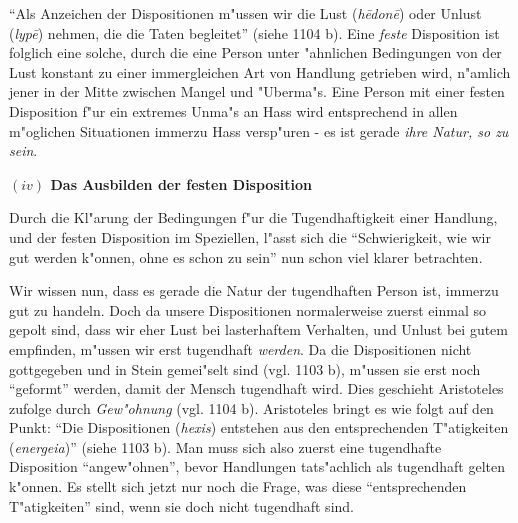\documentclass[a4paper, emulatestandardclasses, 12pt]{scrartcl}
\begin{document}
\begin{onehalfspace}
"`Als Anzeichen der Dispositionen m"ussen wir die Lust (\emph{h\={e}don\={e}}) oder Unlust (\emph{lyp\={e}}) nehmen, die die Taten begleitet"' (siehe 1104 b). Eine \emph{feste} Disposition ist folglich eine solche, durch die eine Person unter "ahnlichen Bedingungen von der Lust konstant zu einer immergleichen Art von Handlung getrieben wird, n"amlich jener in der Mitte zwischen Mangel und "Uberma"s. Eine Person mit einer festen Disposition f"ur ein extremes Unma"s an Hass wird entsprechend in allen m"oglichen Situationen immerzu Hass versp"uren - es ist gerade \emph{ihre Natur, so zu sein}. 

\vspace{6mm}
\newpage
\noindent\textbf{$(iv)$ Das Ausbilden der festen Disposition}	

\noindent Durch die Kl"arung der Bedingungen f"ur die Tugendhaftigkeit einer Handlung, und der festen Disposition im Speziellen, l"asst sich die "`Schwierigkeit, wie wir gut werden k"onnen, ohne es schon zu sein"' nun schon viel klarer betrachten. 

Wir wissen nun, dass es gerade die Natur der tugendhaften Person ist, immerzu gut zu handeln. Doch da unsere Dispositionen normalerweise zuerst einmal so gepolt sind, dass wir eher Lust bei lasterhaftem Verhalten, und Unlust bei gutem empfinden, m"ussen wir erst tugendhaft \emph{werden}. Da die Dispositionen nicht gottgegeben und in Stein gemei"selt sind (vgl. 1103 b), m"ussen sie erst noch "`geformt"' werden, damit der Mensch tugendhaft wird. Dies geschieht Aristoteles zufolge durch \emph{Gew"ohnung} (vgl. 1104 b). Aristoteles bringt es wie folgt auf den Punkt: "`Die Dispositionen (\emph{hexis}) entstehen aus den entsprechenden T"atigkeiten (\emph{energeia})"' (siehe 1103 b). Man muss sich also zuerst eine tugendhafte Disposition "`angew"ohnen"', bevor Handlungen tats"achlich als tugendhaft gelten k"onnen. Es stellt sich jetzt nur noch die Frage, was diese "`entsprechenden T"atigkeiten"' sind, wenn sie doch nicht tugendhaft sind. 


\end{onehalfspace}
\end{document}
